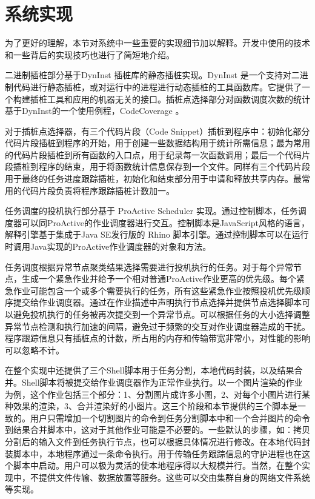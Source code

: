 \section{系统实现}
\label{subsec:no2_impl}
为了更好的理解，本节对系统中一些重要的实现细节加以解释。开发中使用的技术和一些背后的实现技巧也进行了简短地介绍。

二进制插桩部分基于DynInst \cite{Dyninst-Deconstruction} 插桩库的静态插桩实现。DynInst 是一个支持对二进制代码进行静态插桩，或对运行中的进程进行动态插桩的工具函数库。它提供了一个构建插桩工具和应用的机器无关的接口。插桩点选择部分对函数调度次数的统计基于DynInst的一个使用例程，CodeCoverage \cite{codecoverage}。
	
对于插桩点选择器，有三个代码片段（Code Snippet）插桩到程序中：初始化部分代码片段插桩到程序的开始，用于创建一些数据结构用于统计所需信息；最为常用的代码片段插桩到所有函数的入口点，用于纪录每一次函数调用；最后一个代码片段插桩到程序的结束，用于将函数统计信息保存到一个文件。同样有三个代码片段用于最终的任务进度跟踪插桩，初始化和结束部分用于申请和释放共享内存。最常用的代码片段负责将程序跟踪插桩计数加一。

任务调度的投机执行部分基于 ProActive Scheduler \cite{pascheduling} 实现。通过控制脚本，任务调度器可以同ProActive的作业调度器进行交互。控制脚本是JavaScript风格的语言，解释引擎基于集成于Java SE发行版的 Rhino \cite{Rhino:2016} 脚本引擎。通过控制脚本可以在运行时调用Java实现的ProActive作业调度器的对象和方法。

任务调度根据异常节点聚类结果选择需要进行投机执行的任务。对于每个异常节点，生成一个紧急作业并给予一个相对普通ProActive作业更高的优先级。每个紧急作业可能包含一个或多个需要执行的任务，所有这些紧急作业按照投机优先级顺序提交给作业调度器。通过在作业描述中声明执行节点选择并提供节点选择脚本可以避免投机执行的任务被再次提交到一个异常节点。可以根据任务的大小选择调整异常节点检测和执行加速的间隔，避免过于频繁的交互对作业调度器造成的干扰。程序跟踪信息只有插桩点的计数，所占用的内存和传输带宽非常小，对性能的影响可以忽略不计。

在整个实现中还提供了三个Shell脚本用于任务分割，本地代码封装，以及结果合并。Shell脚本将被提交给作业调度器作为正常作业执行。以一个图片渲染的作业为例，这个作业包括三个部分：1、分割图片成许多小图，2、对每个小图片进行某种效果的渲染，3、合并渲染好的小图片。这三个阶段和本节提供的三个脚本是一致的。用户只需增加一个切割图片的命令到任务分割脚本中和一个合并图片的命令到结果合并脚本中，这对于其他作业可能是不必要的。一些默认的步骤，如：拷贝分割后的输入文件到任务执行节点，也可以根据具体情况进行修改。在本地代码封装脚本中，本地程序通过一条命令执行。用于传输任务跟踪信息的守护进程也在这个脚本中启动。用户可以极为灵活的使本地程序得以大规模并行。当然，在整个实现中，不提供文件传输、数据放置等服务。这些可以交由集群自身的网络文件系统等实现。

